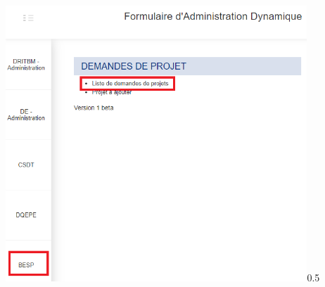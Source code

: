 \documentclass[aspectratio=169]{beamer}%
\let\note\relax
\begin{document}
\begin{frame}
\transwipe 
\begin{columns}
  

    \centering
    \begin{annotate}{\includegraphics[width=0.85\textwidth]{home_list}}{0.5}
    \end{annotate}

  


\end{columns}
\end{frame}
\end{document}
